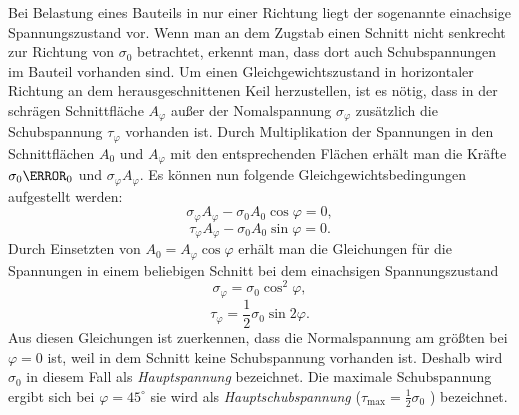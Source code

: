 \documentclass[12pt,a4paper,parskip,twoside,BCOR5mm,headsepline]{scrartcl}
\begin{document}
\begin{description*}
\begin{itemize*}
Bei Belastung eines Bauteils in nur einer Richtung liegt der sogenannte einachsige Spannungszustand vor. Wenn man an dem Zugstab  einen Schnitt nicht senkrecht zur Richtung von $ \sigma_0 $ betrachtet,  erkennt man, dass dort auch Schubspannungen im Bauteil vorhanden sind. Um einen Gleichgewichtszustand in horizontaler Richtung an dem herausgeschnittenen Keil herzustellen,  ist es nötig,  dass in der schrägen Schnittfläche $ A_{\varphi} $ außer der Nomalspannung $ \sigma_{\varphi} $ zusätzlich die Schubspannung $ \tau_{\varphi} $ vorhanden ist. Durch Multiplikation der Spannungen in den Schnittflächen $ A_0 $ und $ A_{\varphi} $ mit den entsprechenden Flächen erhält man die Kräfte $ \sigma_0 \A_0 $ und $ \sigma_{\varphi} A_{\varphi} $. Es können nun folgende Gleichgewichtsbedingungen aufgestellt werden:  \begin{equation}
\sigma_{\varphi}A_{\varphi} - \sigma_0 A_0\cos{\varphi} = 0  
,\end{equation}
\begin{equation}
\tau_{\varphi}A_{\varphi} - \sigma_0A_0\sin{\varphi} = 0
.\end{equation} Durch Einsetzten von $ A_0 = A_{\varphi}\cos{\varphi}$ erhält man die Gleichungen für die Spannungen in einem beliebigen Schnitt bei dem einachsigen Spannungszustand
\begin{equation}
\sigma_{\varphi} = \sigma_0\cos^2{\varphi}
,\end{equation}
\begin{equation}
\tau_{\varphi} = \frac{1}{2} \sigma_0\sin{2\varphi}
.\end{equation}
Aus diesen Gleichungen ist zuerkennen,  dass die Normalspannung am größten bei $ \varphi = 0 $ ist, weil in dem Schnitt keine Schubspannung vorhanden ist. Deshalb wird $ \sigma_0 $ in diesem Fall als \emph{Hauptspannung} bezeichnet. Die maximale Schubspannung ergibt sich bei $ \varphi = 45^{\circ} $ sie wird als \emph{Hauptschubspannung} ($ \tau_{\text{max}} = \frac{1}{2}\sigma_0 $ ) bezeichnet. \autocite[388]{dd}



  

\end{itemize*}
\end{description*}
\end{document}

